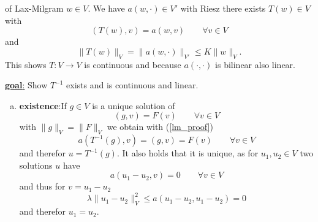 \begin{proof_}
	of Lax-Milgram \enter
	$w \in V$. We have $a(w,\cdot) \in V'$ with Riesz there exists $T(w) \in V$ with 
	\begin{equation}\label{lm_proof}
		(T(w),v) = a(w,v) \qquad \forall v \in V
	\end{equation}
	and 
	\begin{equation*}
		\|T(w)\|_V = \|a(w,\cdot)\|_{V'} \leq K \|w\|_V.
	\end{equation*}
	This shows $T: V \to V$ is continuous and because $a(\cdot,\cdot)$ is bilinear also linear.
\end{proof_}

\par
\underline{\textbf{goal}:}
Show $T^{-1}$ exists and is continuous and linear.\enter

\begin{enumerate}[(a)]
	\item \textbf{existence}:\enter If $g \in V$ is a unique solution of 
	\begin{equation*}
	(g,v) = F(v) \qquad \forall v \in V
	\end{equation*}
	with $\|g\|_V = \|F\|_V$ we obtain with (\ref{lm_proof}) 
	\begin{equation*}
	a(T^{-1}(g),v) = (g,v) = F(v) \qquad \forall v \in V
	\end{equation*}
	and therefor $u = T^{-1}(g)$. It also holds that it is unique, as for $u_1, u_2 \in V$ two solutions $u$ have 
	\begin{equation*}
	a(u_1 - u_2,v) = 0 \qquad \forall v \in V
	\end{equation*}
	and thus for $v = u_1 - u_2$
	\begin{equation*}
	\lambda \|u_1 - u_2\|^2_V \leq a(u_1 -u_2, u_1 -u_2) = 0
	\end{equation*}
	and therefor $u_1 = u_2$.
	

\end{enumerate}
